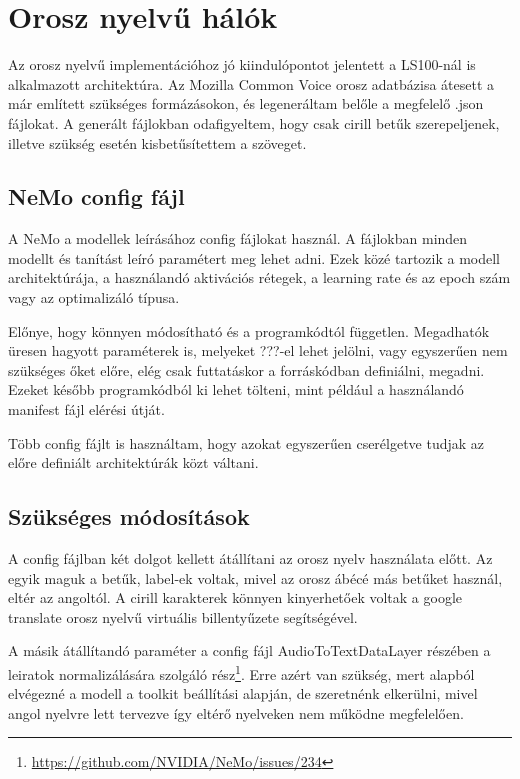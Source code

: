 \section{Orosz nyelvű hálók}

Az orosz nyelvű implementációhoz jó kiindulópontot jelentett a LS100-nál is alkalmazott architektúra. Az Mozilla Common Voice orosz adatbázisa átesett a már említett szükséges formázásokon, és legeneráltam belőle a megfelelő .json fájlokat. A generált fájlokban odafigyeltem, hogy csak cirill betűk szerepeljenek, illetve szükség esetén kisbetűsítettem a szöveget.

\subsection{NeMo config fájl}

A NeMo a modellek leírásához config fájlokat használ. A fájlokban minden modellt és tanítást leíró paramétert meg lehet adni. Ezek közé tartozik a modell architektúrája, a használandó aktivációs rétegek, a learning rate és az epoch szám vagy az optimalizáló típusa.

Előnye, hogy könnyen módosítható és a programkódtól független. Megadhatók üresen hagyott paraméterek is, melyeket ???-el lehet jelölni, vagy egyszerűen nem szükséges őket előre, elég csak futtatáskor a forráskódban definiálni, megadni. Ezeket később programkódból ki lehet tölteni, mint például a használandó manifest fájl elérési útját.

Több config fájlt is használtam, hogy azokat egyszerűen cserélgetve tudjak az előre definiált architektúrák közt váltani.

\subsection{Szükséges módosítások}

A config fájlban két dolgot kellett átállítani az orosz nyelv használata előtt. Az egyik maguk a betűk, label-ek voltak, mivel az orosz ábécé más betűket használ, eltér az angoltól. A cirill karakterek könnyen kinyerhetőek voltak a google translate orosz nyelvű virtuális billentyűzete segítségével.

A másik átállítandó paraméter a config fájl AudioToTextDataLayer részében a leiratok normalizálására szolgáló rész\footnote{\url{https://github.com/NVIDIA/NeMo/issues/234}}. Erre azért van szükség, mert alapból elvégezné a modell a toolkit beállítási alapján, de szeretnénk elkerülni, mivel angol nyelvre lett tervezve így eltérő nyelveken nem működne megfelelően.

